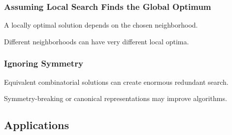 \subsubsection{Assuming Local Search Finds the Global Optimum}

A locally optimal solution depends on the chosen neighborhood.

Different neighborhoods can have very different local optima.

\subsubsection{Ignoring Symmetry}

Equivalent combinatorial solutions can create enormous redundant search.

Symmetry-breaking or canonical representations may improve algorithms.

\subsection{Applications}
\label{subsec:combinatorial-optimization-applications}

